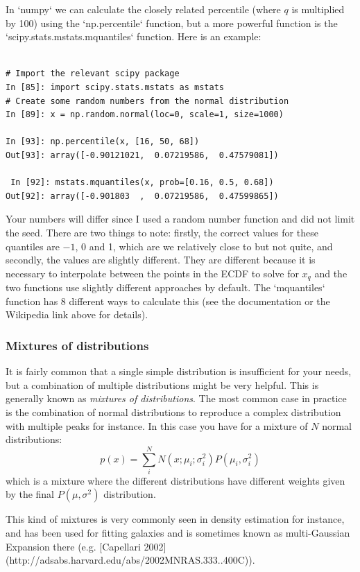 \documentclass[a4paper,10pt]{article}
\begin{document}
In `numpy` we can calculate the closely related percentile (where $q$ is multiplied by 100) using the `np.percentile` function, but a more powerful function is the `scipy.stats.mstats.mquantiles` function. Here is an example:
\begin{lstlisting}

# Import the relevant scipy package
In [85]: import scipy.stats.mstats as mstats
# Create some random numbers from the normal distribution
In [89]: x = np.random.normal(loc=0, scale=1, size=1000)

In [93]: np.percentile(x, [16, 50, 68])
Out[93]: array([-0.90121021,  0.07219586,  0.47579081])

 In [92]: mstats.mquantiles(x, prob=[0.16, 0.5, 0.68])
Out[92]: array([-0.901803  ,  0.07219586,  0.47599865])
\end{lstlisting}


Your numbers will differ since I used a random number function and did not limit the seed. There are two things to note: firstly, the correct values for these quantiles are $-1$, 0 and 1, which are we relatively close to but not quite, and secondly, the values are slightly different. They are different because it is necessary to interpolate between the points in the ECDF to solve for $x_q$ and the two functions use slightly different approaches by default. The `mquantiles` function has 8 different ways to calculate this (see the documentation or the Wikipedia link above for details).

\subsubsection{ Mixtures of distributions}

It is fairly common that a single simple distribution is insufficient for your needs, but a combination of multiple distributions might be very helpful. This is generally known as \textit{mixtures of distributions}. The most common case in practice is the combination of normal distributions to reproduce a complex distribution with multiple peaks  for instance. In this case you have for a mixture of $N$ normal distributions:
$$p(x) = \sum_{i}^{N} N\left(x; \mu_i; \sigma_i^2\right) P\left(\mu_i,\sigma_i^2 \right)$$
which is a mixture where the different distributions have different weights given by the final $P(\mu, \sigma^2)$ distribution.

This kind of mixtures is very commonly seen in density estimation for instance, and has been used for fitting galaxies and is sometimes known as multi-Gaussian Expansion there (e.g. [Capellari 2002](http://adsabs.harvard.edu/abs/2002MNRAS.333..400C)). 
\end{document}
